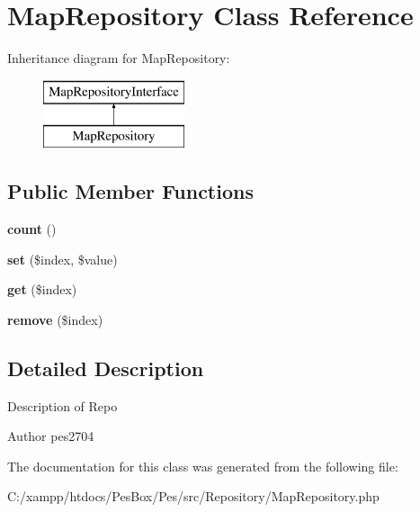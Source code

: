 \hypertarget{class_pes_1_1_repository_1_1_map_repository}{}\section{Map\+Repository Class Reference}
\label{class_pes_1_1_repository_1_1_map_repository}
Inheritance diagram for Map\+Repository\+:\begin{figure}[H]
\begin{center}
\leavevmode
\includegraphics[height=2.000000cm]{class_pes_1_1_repository_1_1_map_repository}
\end{center}
\end{figure}
\subsection*{Public Member Functions}
\begin{DoxyCompactItemize}
\item 
\mbox{\label{class_pes_1_1_repository_1_1_map_repository_ac751e87b3d4c4bf2feb03bee8b092755}} 
{\bfseries count} ()
\item 
\mbox{\label{class_pes_1_1_repository_1_1_map_repository_a427687601a2304ad0fe3c0a371af9944}} 
{\bfseries set} (\$index, \$value)
\item 
\mbox{\label{class_pes_1_1_repository_1_1_map_repository_a83366960f81b1627f37353da9768c264}} 
{\bfseries get} (\$index)
\item 
\mbox{\label{class_pes_1_1_repository_1_1_map_repository_a2554c1a74c0099a5c59e6fa2875de396}} 
{\bfseries remove} (\$index)
\end{DoxyCompactItemize}


\subsection{Detailed Description}
Description of Repo

\begin{DoxyAuthor}{Author}
pes2704 
\end{DoxyAuthor}


The documentation for this class was generated from the following file\+:\begin{DoxyCompactItemize}
\item 
C\+:/xampp/htdocs/\+Pes\+Box/\+Pes/src/\+Repository/Map\+Repository.\+php\end{DoxyCompactItemize}
